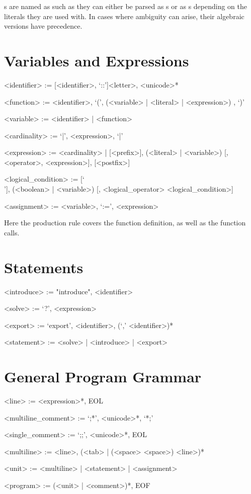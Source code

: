 \documentclass[11pt,a4paper]{book}
\begin{document}
s are named as such as they can either be parsed as s or as s depending on the literals they are used with. In cases where ambiguity can arise, their algebraic versions have precedence.

\section{Variables and Expressions}

\begin{grammar}
<identifier> := [<identifier>, `::']<letter>, <unicode>*

<function> := <identifier>, `(', (<variable> | <literal> | <expression>) , `)'

<variable> := <identifier> | <function>

<cardinality> := `|', <expression>, `|'

<expression> := <cardinality> | [<prefix>], (<literal> | <variable>) [, <operator>, <expression>], [<postfix>]

<logical\_condition> := [`\\'], (<boolean> | <variable>) [, <logical\_operator> <logical\_condition>]

<assignment> := <variable>, `:=', <expression>
\end{grammar}

Here the  production rule covers the function definition, as well as the function calls.

\section{Statements}

\begin{grammar}

<introduce> := "introduce", <identifier>

<solve> := `?', <expression>

<export> := `export', <identifier>, (`,' <identifier>)*

<statement> := <solve> | <introduce> | <export>

\end{grammar}

\section{General Program Grammar}

\begin{grammar}
<line> := <expression>*, EOL

<multiline\_comment> := `;*', <unicode>*, `*;'

<single\_comment> := `;;', <unicode>*, EOL

<multiline> := <line>, (<tab> | (<space> <space>) <line>)*

<unit> := <multiline> | <statement> | <assignment>

<program> := (<unit> | <comment>)*, EOF

\end{grammar}
\end{document}
